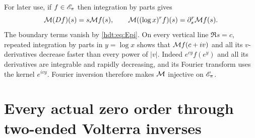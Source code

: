 For later use, if $f\in\mathscr E_\pi$ then integration by parts gives
\begin{equation}\label{hdt:eq:Mellin-rules}
\mathcal M(Df)(s)=s\mathcal M f(s),\qquad
\mathcal M((\log x)^rf)(s)=\partial_s^r\mathcal M f(s).
\end{equation}
The boundary terms vanish by \eqref{hdt:eq:Epi}. On every vertical line
$\Re s=c$, repeated integration by parts in $y=\log x$ shows that
$\mathcal M f(c+iv)$ and all its $v$-derivatives decrease faster than every
power of $|v|$. Indeed $e^{cy}f(e^y)$ and all its derivatives are
integrable and rapidly decreasing, and its Fourier transform uses
the kernel $e^{ivy}$. Fourier inversion therefore makes $\mathcal M$
injective on $\mathscr E_\pi$.

\section{Every actual zero order through two-ended Volterra inverses}

